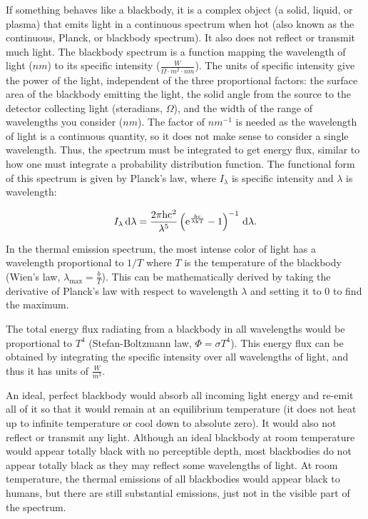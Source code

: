 \documentclass[12pt]{article}
\begin{document}
If something behaves like a blackbody, it is a complex object (a solid, liquid, or plasma) that emits light in a continuous spectrum when hot (also known as the continuous, Planck, or blackbody spectrum). It also does not reflect or transmit much light. The blackbody spectrum is a function mapping the wavelength of light ($\si{nm}$) to its specific intensity ($\si{\frac{W}{\Omega\cdot m^2 \cdot nm}}$). The units of specific intensity give the power of the light, independent of the three proportional factors: the surface area of the blackbody emitting the light, the solid angle from the source to the detector collecting light (steradians, $\Omega$), and the width of the range of wavelengths you consider ($\si{nm}$). The factor of $\si{nm^{-1}}$ is needed as the wavelength of light is a continuous quantity, so it does not make sense to consider a single wavelength. Thus, the spectrum must be integrated to get energy flux, similar to how one must integrate a probability distribution function. The functional form of this spectrum is given by Planck's law, where $I_\lambda$ is specific intensity and $\lambda$ is wavelength:

\begin{equation}
    I_\lambda\,\rm{d}\lambda = \frac{2\pi h c^2}{\lambda^5} \left(e^{\frac{h c}{\lambda k T}} - 1\right)^{-1}\,\rm{d}\lambda.
\end{equation}

In the thermal emission spectrum, the most intense color of light has a wavelength proportional to $1/T$ where $T$ is the temperature of the blackbody (Wien's law, $\lambda_\text{max} = \frac{b}{T}$). This can be mathematically derived by taking the derivative of Planck's law with respect to wavelength $\lambda$ and setting it to 0 to find the maximum.

The total energy flux radiating from a blackbody in all wavelengths would be proportional to $T^4$ (Stefan-Boltzmann law, $\Phi = \sigma T^4$). This energy flux can be obtained by integrating the specific intensity over all wavelengths of light, and thus it has units of $\si{\frac{W}{m^2}}$. 

An ideal, perfect blackbody would absorb all incoming light energy and re-emit all of it so that it would remain at an equilibrium temperature (it does not heat up to infinite temperature or cool down to absolute zero). It would also not reflect or transmit any light. Although an ideal blackbody at room temperature would appear totally black with no perceptible depth, most blackbodies do not appear totally black as they may reflect some wavelengths of light. At room temperature, the thermal emissions of all blackbodies would appear black to humans, but there are still substantial emissions, just not in the visible part of the spectrum. 
\end{document}
